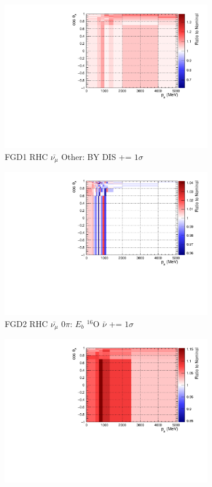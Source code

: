 \begin{figure}[!htbp]
\begin{subfigure}{.32\textwidth}
  \includegraphics[width=0.85\linewidth]{figs/sig/FGD1_anti-numuCC_other_CC_BY_DIS_+1sig.pdf}
  \caption{FGD1 RHC $\bar{\nu_{\mu}}$ Other: BY DIS += $1\sigma$}
  \label{fig:sigvar_FGD1_anti-numuCC_other}
\end{subfigure}
\centering
\begin{subfigure}{.32\textwidth}
  \centering
  \includegraphics[width=0.85\linewidth]{figs/sig/FGD2_anti-numuCC_0pi_EB_dial_O_nubar_+1sig.pdf}
  \caption{FGD2 RHC $\bar{\nu_{\mu}}$ 0$\pi$: $E_{b}$ $^{16}$O $\bar{\nu}$ += $1\sigma$}
  \label{fig:sigvar_FGD2_anti-numuCC_0pi}
\end{subfigure}
\begin{subfigure}{.32\textwidth}
  \centering
  \includegraphics[width=0.85\linewidth]{figs/sig/FGD2_anti-numuCC_1pi_ISO_BKG_+1sig.pdf}

\end{subfigure}
\end{figure}
